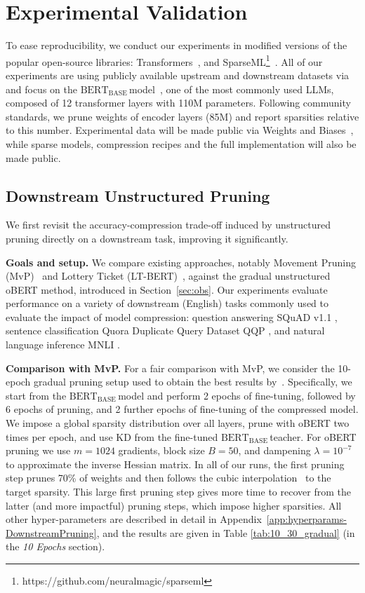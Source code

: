 \documentclass[11pt]{article}
\newcommand{\bert}{$\textrm{BERT}_{\textrm{BASE}}\,$}
\begin{document}
\section{Experimental Validation}
\label{sec:experiments}
To ease reproducibility, we conduct our experiments in modified versions of the popular open-source libraries: Transformers~\cite{wolf-etal-2020-transformers}, and SparseML\footnote{https://github.com/neuralmagic/sparseml}~\cite{pmlr-v119-kurtz20a}. All of our experiments are using publicly available upstream and downstream datasets via~\cite{hf-datasets} and focus on the \bert model~\cite{Devlin2019BERTPO}, one of the most commonly used LLMs, composed of 12 transformer layers with 110M parameters. Following community standards, we prune weights of encoder layers (85M) and report sparsities relative to this number. Experimental data will be made public via Weights and Biases~\cite{wandb}, while sparse models, compression recipes and the full implementation will also be made public.

\subsection{Downstream Unstructured Pruning}
\label{sec:downstream}

We first revisit the accuracy-compression trade-off induced by unstructured pruning directly on a downstream task, improving it significantly. 

\noindent\textbf{Goals and setup.} 
We compare existing approaches, notably Movement Pruning (MvP)~\cite{Sanh2020MovementPA} and Lottery Ticket (LT-BERT)~\cite{Chen2020TheLT}, against the gradual unstructured oBERT method, introduced in Section~\ref{sec:obs}. Our experiments evaluate performance on a variety of downstream (English) tasks commonly used to evaluate the impact of model compression: question answering SQuAD v1.1 \cite{Rajpurkar2016SQuAD1Q}, sentence classification Quora Duplicate Query Dataset QQP \cite{Guo2017DuplicateQQ}, and natural language inference MNLI \cite{N18-1101}.

\noindent\textbf{Comparison with MvP.} For a fair comparison with MvP, we consider the 10-epoch gradual pruning setup used to obtain the best results by~\citet{Sanh2020MovementPA}. Specifically, we start from the \bert model and perform 2 epochs of fine-tuning, followed by 6 epochs of pruning, and 2 further epochs of fine-tuning of the compressed model. We impose a global sparsity distribution over all layers, prune with oBERT two times per epoch, and use KD from the fine-tuned \bert teacher. For oBERT pruning we use $m=1024$ gradients, block size $B=50$, and dampening $\lambda = 10^{-7}$ to approximate the inverse Hessian matrix. In all of our runs, the first pruning step prunes 70\% of weights and then follows the cubic interpolation~\cite{Zhu2018ToPO} to the target sparsity. This large first pruning step gives more time to recover from the latter (and more impactful) pruning steps, which impose higher sparsities. All other hyper-parameters are described in detail in Appendix~\ref{app:hyperparams-DownstreamPruning}, and the results are given in Table \ref{tab:10_30_gradual} (in the \textit{10 Epochs} section). 
\end{document}
